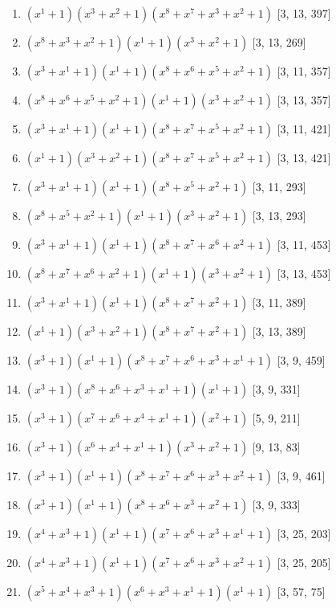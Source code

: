 \documentclass[10pt,twocolumn]{article}
\begin{document}
\begin{enumerate}
\item $(x^{1} + 1)(x^{3} + x^{2} + 1)(x^{8} + x^{7} + x^{3} + x^{2} + 1)$  [3, 13, 397]
\item $(x^{8} + x^{3} + x^{2} + 1)(x^{1} + 1)(x^{3} + x^{2} + 1)$  [3, 13, 269]
\item $(x^{3} + x^{1} + 1)(x^{1} + 1)(x^{8} + x^{6} + x^{5} + x^{2} + 1)$  [3, 11, 357]
\item $(x^{8} + x^{6} + x^{5} + x^{2} + 1)(x^{1} + 1)(x^{3} + x^{2} + 1)$  [3, 13, 357]
\item $(x^{3} + x^{1} + 1)(x^{1} + 1)(x^{8} + x^{7} + x^{5} + x^{2} + 1)$  [3, 11, 421]
\item $(x^{1} + 1)(x^{3} + x^{2} + 1)(x^{8} + x^{7} + x^{5} + x^{2} + 1)$  [3, 13, 421]
\item $(x^{3} + x^{1} + 1)(x^{1} + 1)(x^{8} + x^{5} + x^{2} + 1)$  [3, 11, 293]
\item $(x^{8} + x^{5} + x^{2} + 1)(x^{1} + 1)(x^{3} + x^{2} + 1)$  [3, 13, 293]
\item $(x^{3} + x^{1} + 1)(x^{1} + 1)(x^{8} + x^{7} + x^{6} + x^{2} + 1)$  [3, 11, 453]
\item $(x^{8} + x^{7} + x^{6} + x^{2} + 1)(x^{1} + 1)(x^{3} + x^{2} + 1)$  [3, 13, 453]
\item $(x^{3} + x^{1} + 1)(x^{1} + 1)(x^{8} + x^{7} + x^{2} + 1)$  [3, 11, 389]
\item $(x^{1} + 1)(x^{3} + x^{2} + 1)(x^{8} + x^{7} + x^{2} + 1)$  [3, 13, 389]
\item $(x^{3} + 1)(x^{1} + 1)(x^{8} + x^{7} + x^{6} + x^{3} + x^{1} + 1)$  [3, 9, 459]
\item $(x^{3} + 1)(x^{8} + x^{6} + x^{3} + x^{1} + 1)(x^{1} + 1)$  [3, 9, 331]
\item $(x^{3} + 1)(x^{7} + x^{6} + x^{4} + x^{1} + 1)(x^{2} + 1)$  [5, 9, 211]
\item $(x^{3} + 1)(x^{6} + x^{4} + x^{1} + 1)(x^{3} + x^{2} + 1)$  [9, 13, 83]
\item $(x^{3} + 1)(x^{1} + 1)(x^{8} + x^{7} + x^{6} + x^{3} + x^{2} + 1)$  [3, 9, 461]
\item $(x^{3} + 1)(x^{1} + 1)(x^{8} + x^{6} + x^{3} + x^{2} + 1)$  [3, 9, 333]
\item $(x^{4} + x^{3} + 1)(x^{1} + 1)(x^{7} + x^{6} + x^{3} + x^{1} + 1)$  [3, 25, 203]
\item $(x^{4} + x^{3} + 1)(x^{1} + 1)(x^{7} + x^{6} + x^{3} + x^{2} + 1)$  [3, 25, 205]
\item $(x^{5} + x^{4} + x^{3} + 1)(x^{6} + x^{3} + x^{1} + 1)(x^{1} + 1)$  [3, 57, 75]

\end{enumerate}
\end{document}
